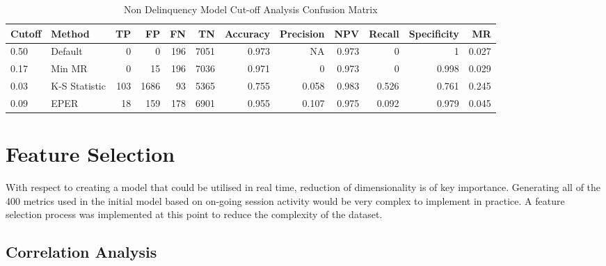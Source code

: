 \begin{table}[H]
	\centering
	\resizebox{\textwidth}{!}
	{
		\begin{tabular}{l|l|r|r|r|r|r|r|r|r|r|r}
			\hline
		\textbf{Cutoff} & \textbf{Method} & \textbf{TP} & \textbf{FP} & \textbf{FN} & \textbf{TN} & \textbf{Accuracy} & \textbf{Precision} & \textbf{NPV} & \textbf{Recall} & \textbf{Specificity} & \textbf{MR} \\ \hline
			0.50            & Default         & 0           & 0           & 196         & 7051        & 0.973             & NA                 & 0.973        & 0               & 1                    & 0.027       \\
			0.17            & Min MR          & 0           & 15          & 196         & 7036        & 0.971             & 0                  & 0.973        & 0               & 0.998                & 0.029       \\
			0.03            & K-S Statistic   & 103         & 1686        & 93          & 5365        & 0.755             & 0.058              & 0.983        & 0.526           & 0.761                & 0.245       \\
			0.09            & EPER            & 18          & 159         & 178         & 6901        & 0.955             & 0.107              & 0.975        & 0.092           & 0.979                & 0.045 \\ \hline  
		\end{tabular}
		}
	\caption{Non Delinquency Model Cut-off Analysis Confusion Matrix}
	\label{my-label}
\end{table}

\section{Feature Selection}
With respect to creating a model that could be utilised in real time, reduction of dimensionality is of key importance. Generating all of the 400 metrics used in the initial model based on on-going session activity would be very complex to implement in practice. A feature selection process was implemented at this point to reduce the complexity of the dataset. 

\subsection{Correlation Analysis}

